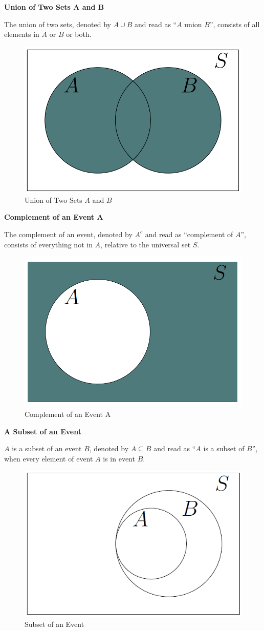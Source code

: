 \documentclass[
  12pt,
]{krantzNoCorner}
\begin{document}
\textbf{Union of Two Sets A and B}

The union of two sets, denoted by \(A \cup B\) and read as ``\(A\) union
\(B\)'', consists of all elements in \(A\) or \(B\) or both.

\begin{figure}
\includegraphics[width=0.5\linewidth,height=0.4\textheight]{Ven2} \caption{Union of Two Sets $A$ and $B$}\label{fig:unio}
\end{figure}

\textbf{Complement of an Event A}

The complement of an event, denoted by \(A^c\) and read as ``complement of
\(A\)'', consists of everything not in \(A\), relative to the universal set
\(S\).

\begin{figure}
\includegraphics[width=0.5\linewidth,height=0.4\textheight]{Ven3} \caption{Complement of an Event A}\label{fig:compl}
\end{figure}

\textbf{A Subset of an Event}

\(A\) is a subset of an event \(B\), denoted by \(A \subseteq B\) and read as
``\(A\) is a subset of \(B\)'', when every element of event \(A\) is in event
\(B\).

\begin{figure}
\includegraphics[width=0.5\linewidth,height=0.4\textheight]{Ven4} \caption{Subset of an Event}\label{fig:subs}
\end{figure}
\end{document}
